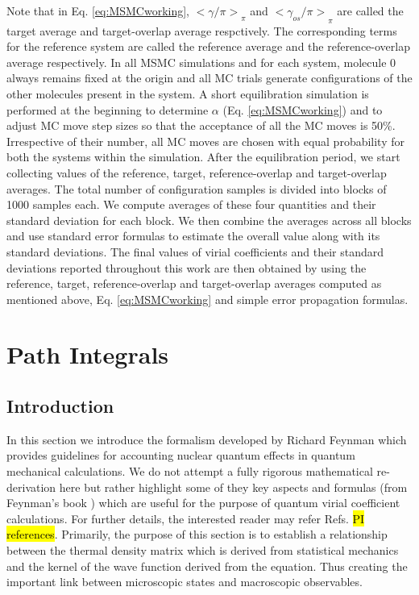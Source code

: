         Note that in Eq. \eqref{eq:MSMCworking}, ${<\gamma/\pi>}_\pi$ and ${<\gamma_{os}/\pi>}_\pi$ are called the target average and target-overlap average respctively. The corresponding terms for the reference system are called the reference average and the reference-overlap average respectively. In all MSMC simulations and for each system, molecule 0 always remains fixed at the origin and all MC trials generate configurations of the other molecules present in the system. A short equilibration simulation is performed at the beginning to determine $\alpha$ (Eq. \eqref{eq:MSMCworking}) and to adjust MC move step sizes so that the acceptance of all the MC moves is 50\%. Irrespective of their number, all MC moves are chosen with equal probability for both the systems within the simulation. After the equilibration period, we start collecting values of the reference, target, reference-overlap and target-overlap averages. The total number of configuration samples is divided into blocks of 1000 samples each. We compute averages of these four quantities and their standard deviation for each block. We then combine the averages across all blocks and use standard error formulas to estimate the overall value along with its standard deviations. The final values of virial coefficients and their standard deviations reported throughout this work are then obtained by using the reference, target, reference-overlap and target-overlap averages computed as mentioned above, Eq. \eqref{eq:MSMCworking} and simple error propagation formulas.

\section{Path Integrals}
    \subsection{Introduction}
        In this section we introduce the formalism developed by Richard Feynman \cite{Feynman} which provides guidelines for accounting nuclear quantum effects in quantum mechanical calculations. We do not attempt a fully rigorous mathematical re-derivation here but rather highlight some of they key aspects and formulas (from Feynman's book \cite{Feynman}) which are useful for the purpose of quantum virial coefficient calculations. For further details, the interested reader may refer Refs. \hl{PI references}. Primarily, the purpose of this section is to establish a relationship between the thermal density matrix which is derived from statistical mechanics and the kernel of the wave function derived from the \Schrodinger{} equation. Thus creating the important link between microscopic states and macroscopic observables.

